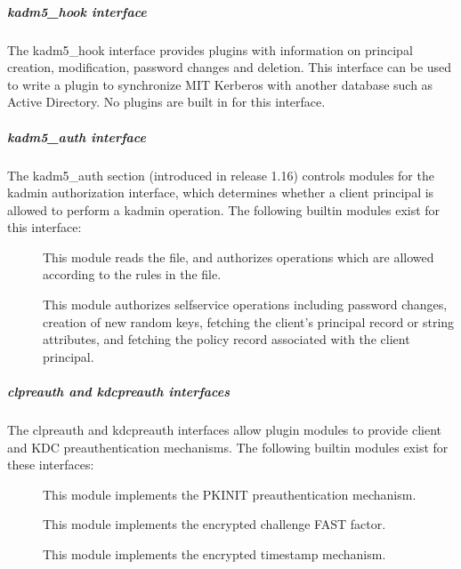 \documentclass[letterpaper,10pt,english]{sphinxmanual}
\begin{document}
\subparagraph{kadm5\_hook interface}
\label{\detokenize{admin/conf_files/krb5_conf:kadm5-hook-interface}}\label{\detokenize{admin/conf_files/krb5_conf:kadm5-hook}}
\sphinxAtStartPar
The kadm5\_hook interface provides plugins with information on
principal creation, modification, password changes and deletion.  This
interface can be used to write a plugin to synchronize MIT Kerberos
with another database such as Active Directory.  No plugins are built
in for this interface.


\subparagraph{kadm5\_auth interface}
\label{\detokenize{admin/conf_files/krb5_conf:kadm5-auth-interface}}\label{\detokenize{admin/conf_files/krb5_conf:kadm5-auth}}
\sphinxAtStartPar
The kadm5\_auth section (introduced in release 1.16) controls modules
for the kadmin authorization interface, which determines whether a
client principal is allowed to perform a kadmin operation.  The
following built\sphinxhyphen{}in modules exist for this interface:
\begin{description}
\item[{}] \leavevmode
\sphinxAtStartPar
This module reads the {\hyperref[\detokenize{admin/conf_files/kadm5_acl:kadm5-acl-5}]{}} file, and authorizes
operations which are allowed according to the rules in the file.

\item[{}] \leavevmode
\sphinxAtStartPar
This module authorizes self\sphinxhyphen{}service operations including password
changes, creation of new random keys, fetching the client’s
principal record or string attributes, and fetching the policy
record associated with the client principal.

\end{description}


\subparagraph{clpreauth and kdcpreauth interfaces}
\label{\detokenize{admin/conf_files/krb5_conf:clpreauth-and-kdcpreauth-interfaces}}\label{\detokenize{admin/conf_files/krb5_conf:kdcpreauth}}\label{\detokenize{admin/conf_files/krb5_conf:clpreauth}}
\sphinxAtStartPar
The clpreauth and kdcpreauth interfaces allow plugin modules to
provide client and KDC preauthentication mechanisms.  The following
built\sphinxhyphen{}in modules exist for these interfaces:
\begin{description}
\item[{}] \leavevmode
\sphinxAtStartPar
This module implements the PKINIT preauthentication mechanism.

\item[{}] \leavevmode
\sphinxAtStartPar
This module implements the encrypted challenge FAST factor.

\item[{}] \leavevmode
\sphinxAtStartPar
This module implements the encrypted timestamp mechanism.

\end{description}
\end{document}
